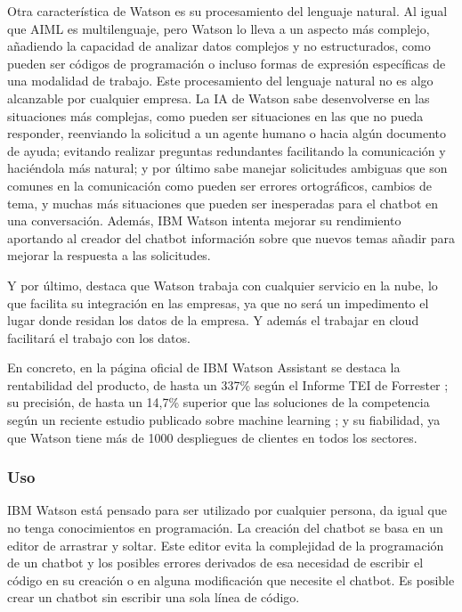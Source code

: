Otra característica de Watson es su procesamiento del lenguaje natural. Al igual que AIML es multilenguaje, pero Watson lo lleva a un aspecto más complejo, añadiendo la capacidad de analizar datos complejos y no estructurados, como pueden ser códigos de programación o incluso formas de expresión específicas de una modalidad de trabajo. Este procesamiento del lenguaje natural no es algo alcanzable por cualquier empresa. La \gls{IA} de Watson sabe desenvolverse en las situaciones más complejas, como pueden ser situaciones en las que no pueda responder, reenviando la solicitud a un agente humano o hacia algún documento de ayuda; evitando realizar preguntas redundantes facilitando la comunicación y haciéndola más natural; y por último sabe manejar solicitudes ambiguas que son comunes en la comunicación como pueden ser errores ortográficos, cambios de tema, y muchas más situaciones que pueden ser inesperadas para el chatbot en una conversación. Además, IBM Watson intenta mejorar su rendimiento aportando al creador del chatbot información sobre que nuevos temas añadir para mejorar la respuesta a las solicitudes.

Y por último, destaca que Watson trabaja con cualquier servicio en la nube, lo que facilita su integración en las empresas, ya que no será un impedimento el lugar donde residan los datos de la empresa. Y además el trabajar en \gls{cloud} facilitará el trabajo con los datos.

En concreto, en la página oficial de IBM Watson Assistant \cite{RefWorks:RefID:17-ibm} se destaca la rentabilidad del producto, de hasta un 337\% según el Informe TEI de Forrester \cite{RefWorks:RefID:8-iles2020el}; su precisión, de hasta un 14,7\% superior que las soluciones de la competencia según un reciente estudio publicado sobre machine learning \cite{RefWorks:RefID:18-2020watson}; y su fiabilidad, ya que Watson tiene más de 1000 despliegues de clientes en todos los sectores.

\subsubsection*{Uso}

IBM Watson está pensado para ser utilizado por cualquier persona, da igual que no tenga conocimientos en programación. La creación del chatbot se basa en un editor de arrastrar y soltar. Este editor evita la complejidad de la programación de un chatbot y los posibles errores derivados de esa necesidad de escribir el código en su creación o en alguna modificación que necesite el chatbot. Es posible crear un chatbot sin escribir una sola línea de código.

